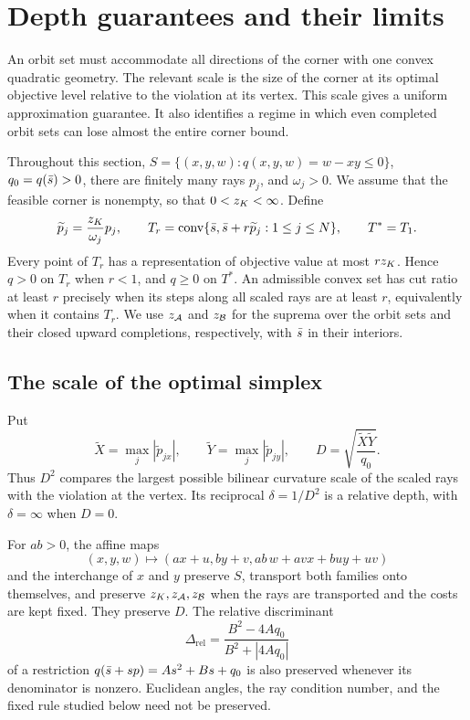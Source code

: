 \section{Depth guarantees and their limits}\label{dp:section}

An orbit set must accommodate all directions of the corner with one convex
quadratic geometry. The relevant scale is the size of the corner at its
optimal objective level relative to the violation at its vertex. This scale
gives a uniform approximation guarantee. It also identifies a regime in which
even completed orbit sets can lose almost the entire corner bound.

Throughout this section, $S=\{(x,y,w):q(x,y,w)=w-xy\le0\}$,
$q_0=q(\bar s)>0$, there are finitely many rays $p_j$, and
$\omega_j>0$. We assume that the feasible corner is nonempty, so that
$0<z_K<\infty$. Define
\begin{equation}\label{dp:scaled-rays}
 \widetilde p_j=\frac{z_K}{\omega_j}p_j,\qquad
 T_r=\operatorname{conv}\{\bar s,\bar s+r\widetilde p_j:1\le j\le N\},\qquad T^*=T_1.
\end{equation}
Every point of $T_r$ has a representation of objective value at most
$rz_K$. Hence $q>0$ on $T_r$ when $r<1$, and $q\ge0$ on $T^*$.
An admissible convex set has cut ratio at least $r$ precisely when its
steps along all scaled rays are at least $r$, equivalently when it contains
$T_r$. We use $z_{\mathcal A}$ and $z_{\mathcal B}$ for the suprema over the orbit sets and their
closed upward completions, respectively, with $\bar s$ in their interiors.

\subsection{The scale of the optimal simplex}

Put
\begin{equation}\label{dp:depth}
 \widetilde X=\max_j|\widetilde p_{jx}|,\qquad
 \widetilde Y=\max_j|\widetilde p_{jy}|,\qquad
 D=\sqrt{\frac{\widetilde X\widetilde Y}{q_0}}.
\end{equation}
Thus $D^2$ compares the largest possible bilinear curvature scale of the
scaled rays with the violation at the vertex. Its reciprocal
$\delta=1/D^2$ is a relative depth, with $\delta=\infty$ when $D=0$.

\begin{lemma}\label{dp:symmetries}
For $ab>0$, the affine maps
\[
 (x,y,w)\longmapsto
 (ax+u,by+v,ab\,w+avx+buy+uv)
\]
and the interchange of $x$ and $y$ preserve $S$, transport both families
onto themselves, and preserve $z_K,z_{\mathcal A},z_{\mathcal B}$ when the rays are transported
and the costs are kept fixed. They preserve $D$. The relative discriminant
\begin{equation}\label{dp:relative-discriminant}
 \Delta_{\mathrm{rel}}=
 \frac{B^2-4Aq_0}{B^2+|4Aq_0|}
\end{equation}
of a restriction $q(\bar s+sp)=As^2+Bs+q_0$ is also preserved whenever its
denominator is nonzero. Euclidean angles, the ray condition number, and the
fixed rule studied below need not be preserved.
\end{lemma}

